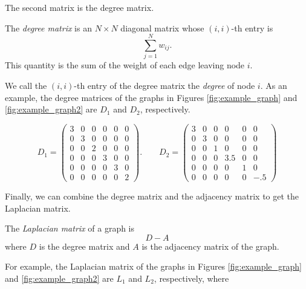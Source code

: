 The second matrix is the degree matrix. 
\begin{definition} The \emph{degree matrix} is an $N \times N$ diagonal matrix whose $(i,i)$-th entry is
\[ 
\sum_{j=1}^N w_{ij}.
\]
This quantity is the sum of the weight of each edge leaving node $i$.
\end{definition}
We call the $(i, i)$-th entry of the degree matrix the \emph{degree} of node $i$. As an example, the degree matrices of the graphs in Figures \ref{fig:example_graph} and \ref{fig:example_graph2} are $D_1$ and $D_2$, respectively.

\[
D_1 = \begin{pmatrix}
3 & 0 & 0 & 0 & 0 & 0\\
0 & 3 & 0 & 0 & 0 & 0\\
0 & 0 & 2 & 0 & 0 & 0\\
0 & 0 & 0 & 3 & 0 & 0\\
0 & 0 & 0 & 0 & 3 & 0\\
0 & 0 & 0 & 0 & 0 & 2
\end{pmatrix}. \qquad D_2 = 
 \begin{pmatrix}
3 & 0 & 0 & 0 & 0 & 0\\
0 & 3 & 0 & 0 & 0 & 0\\
0 & 0 & 1 & 0 & 0 & 0\\
0 & 0 & 0 & 3.5 & 0 & 0\\
0 & 0 & 0 & 0 & 1 & 0\\
0 & 0 & 0 & 0 & 0 & -.5
\end{pmatrix}
\]

Finally, we can combine the degree matrix and the adjacency matrix to get the Laplacian matrix.
\begin{definition}
The \emph{Laplacian matrix} of a graph is 
\[D - A \]
where $D$ is the degree matrix and $A$ is the adjacency matrix of the graph.
\end{definition}

For example, the Laplacian matrix of the graphs in Figures \ref{fig:example_graph} and \ref{fig:example_graph2} are $L_1$ and $L_2$, respectively, where

